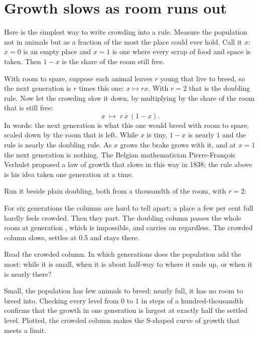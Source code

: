 \section{Growth slows as room runs out}
\label{sec:ch03-logistic}

\noindent
Here is the simplest way to write crowding into a rule. Measure the
population not in animals but as a fraction of the most the place could
ever hold. Call it $x$: $x = 0$ is an empty place and $x = 1$ is one where
every scrap of food and space is taken. Then $1 - x$ is the share of the
room still free.

With room to spare, suppose each animal leaves $r$ young that live to breed,
so the next generation is $r$ times this one: $x \mapsto r x$. With $r = 2$ that
is the doubling rule. Now let the crowding slow it down, by multiplying by
the share of the room that is still free:
\[ x \;\mapsto\; r\,x\,(1 - x). \]
In words: the next generation is what this one would breed with room to
spare, scaled down by the room that is left. While $x$ is tiny, $1 - x$ is
nearly $1$ and the rule is nearly the doubling rule. As $x$ grows the brake
grows with it, and at $x = 1$ the next generation is nothing. The Belgian
mathematician Pierre-François Verhulst proposed a law of growth that slows
in this way in 1838; the rule above is his idea taken one generation at a
time.


\noindent
Run it beside plain doubling, both from a thousandth of the room, with
$r = 2$:



\noindent
For six generations the columns are hard to tell apart; a place a few per
cent full hardly feels crowded. Then they part. The doubling column passes
the whole room at generation , which is impossible, and
carries on regardless. The crowded column slows, settles at \num{0.5} and
stays there.

\begin{think}
Read the crowded column. In which generations does the population add the
most: while it is small, when it is about half-way to where it ends up, or
when it is nearly there?
\end{think}
Small, the population has few animals to breed; nearly full, it has no room
to breed into. Checking every level from $0$ to $1$ in steps of a
hundred-thousandth confirms that the growth in one generation is largest at
exactly half the settled level. Plotted, the crowded column makes the
S-shaped curve of growth that meets a limit.

